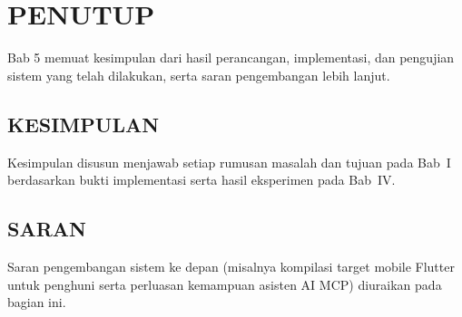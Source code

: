 \chapter{PENUTUP}

Bab 5 memuat kesimpulan dari hasil perancangan, implementasi, dan pengujian sistem yang telah dilakukan, serta saran pengembangan lebih lanjut.

\section{KESIMPULAN}

Kesimpulan disusun menjawab setiap rumusan masalah dan tujuan pada Bab~I berdasarkan bukti implementasi serta hasil eksperimen pada Bab~IV.

\section{SARAN}

Saran pengembangan sistem ke depan (misalnya kompilasi target mobile Flutter untuk penghuni serta perluasan kemampuan asisten AI MCP) diuraikan pada bagian ini.
